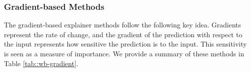 
\subsubsection{Gradient-based Methods}
\label{sec::gradient-based}
The gradient-based explainer methods follow the following key idea. Gradients represent the rate of change, and the gradient of the prediction with respect to the input represents how sensitive the prediction is to the input. This sensitivity is seen as a measure of importance. We provide a summary of these methods in Table \ref{tab::wb-gradient}.

